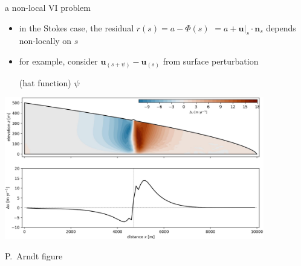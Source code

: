 \documentclass[svgnames,
               hyperref={colorlinks,citecolor=DeepPink4,linkcolor=FireBrick,urlcolor=Maroon},
               usepdftitle=false]  %
               {beamer}
\newcommand{\bn}{\mathbf{n}}
\newcommand{\bu}{\mathbf{u}}
\begin{document}
\begin{frame}{a non-local VI problem}

\begin{itemize}
\item in the Stokes case, the residual $r(s) = a - \Phi(s)$ $= a + \bu|_s \cdot \bn_s$ \alert{depends non-locally on $s$}
\item for example, consider $\bu_{(s+\psi)} - \bu_{(s)}$ from surface perturbation

(hat function) $\psi$
\end{itemize}

\medskip
\begin{center}
\includegraphics[width=0.85\textwidth]{images/stokes-greens-arndt.png}
\end{center}

\vspace{-5mm}
\hfill {\tiny P.~Arndt figure}
\end{frame}
\end{document}
